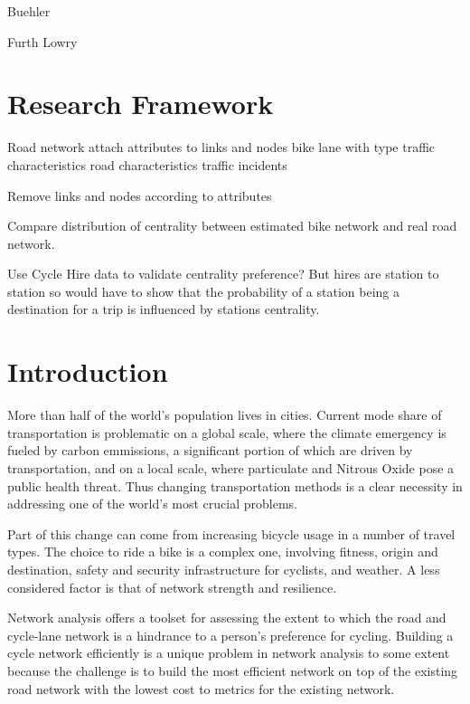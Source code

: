 \documentclass[11pt]{article} %
\begin{document}
Buehler

Furth
Lowry
	
	
	
\section{Research Framework}

Road network
	attach attributes to links and nodes
		bike lane with type
		traffic characteristics
		road characteristics
		traffic incidents
		
Remove links and nodes according to attributes

Compare distribution of centrality between estimated bike network and real road network. 

Use Cycle Hire data to validate centrality preference?
	But hires are station to station so would have to show that the probability of a station being a destination for a trip is influenced by stations centrality. 


	
	









\section{Introduction}

	More than half of the world's population lives in cities. Current mode share of transportation is problematic on a global scale, where the climate emergency is fueled by carbon emmissions, a significant portion of which are driven by transportation, and on a local scale, where particulate and Nitrous Oxide pose a public health threat. Thus changing transportation methods is a clear necessity in addressing one of the world's most crucial problems. 
	
	Part of this change can come from increasing bicycle usage in a number of travel types. The choice to ride a bike is a complex one, involving fitness, origin and destination, safety and security infrastructure for cyclists, and weather. A less considered factor is that of network strength and resilience.
	
	Network analysis offers a toolset for assessing the extent to which the road and cycle-lane network is a hindrance to a person's preference for cycling. Building a cycle network efficiently is a unique problem in network analysis to some extent because the challenge is to build the most efficient network on top of the existing road network with the lowest cost to metrics for the existing network. 
	
\end{document}
